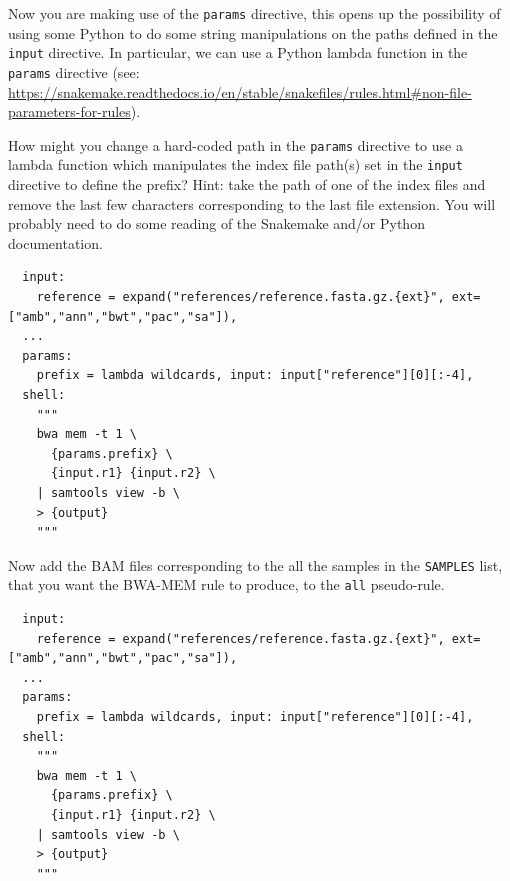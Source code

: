\begin{questions}

Now you are making use of the \texttt{params} directive, this opens up the possibility of using some Python to do some string manipulations
on the paths defined in the \texttt{input} directive. In particular, we can use a Python lambda function in the \texttt{params} directive
(see: \url{https://snakemake.readthedocs.io/en/stable/snakefiles/rules.html#non-file-parameters-for-rules}).

How might you change a hard-coded path in the \texttt{params} directive to use a lambda function which manipulates the index file path(s) set
in the \texttt{input} directive to define the prefix? Hint: take the path of one of the index files and remove the last few characters
corresponding to the last file extension. You will probably need to do some reading of the Snakemake and/or Python documentation.

\begin{answer}

\begin{lstlisting}
  input:
    reference = expand("references/reference.fasta.gz.{ext}", ext=["amb","ann","bwt","pac","sa"]),
  ...
  params:
    prefix = lambda wildcards, input: input["reference"][0][:-4],
  shell:
    """
    bwa mem -t 1 \
      {params.prefix} \
      {input.r1} {input.r2} \
    | samtools view -b \
    > {output}
    """
\end{lstlisting}

\end{answer}

Now add the BAM files corresponding to the all the samples in the \texttt{SAMPLES} list, that you want the BWA-MEM rule to produce, to the
\texttt{all} pseudo-rule.

\begin{answer}

\begin{lstlisting}
  input:
    reference = expand("references/reference.fasta.gz.{ext}", ext=["amb","ann","bwt","pac","sa"]),
  ...
  params:
    prefix = lambda wildcards, input: input["reference"][0][:-4],
  shell:
    """
    bwa mem -t 1 \
      {params.prefix} \
      {input.r1} {input.r2} \
    | samtools view -b \
    > {output}
    """
\end{lstlisting}

\end{answer}

\end{questions}

